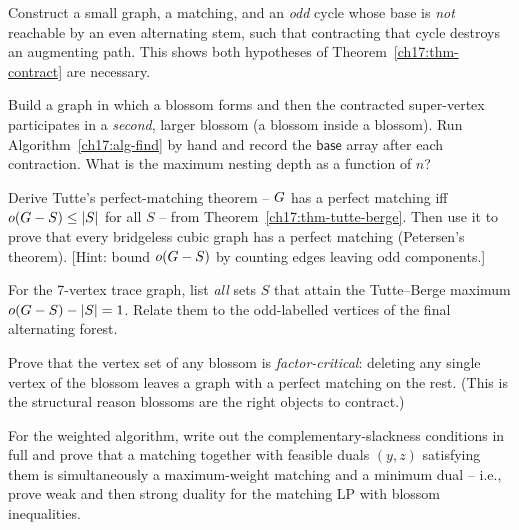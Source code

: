 \begin{exercise}
\label{ch17:ex-break}
Construct a small graph, a matching, and an \emph{odd} cycle whose base is \emph{not} reachable by an
even alternating stem, such that contracting that cycle destroys an augmenting path. This shows both
hypotheses of Theorem~\ref{ch17:thm-contract} are necessary.
\end{exercise}

\begin{exercise}
\label{ch17:ex-nested}
Build a graph in which a blossom forms and then the contracted super-vertex participates in a
\emph{second}, larger blossom (a blossom inside a blossom). Run Algorithm~\ref{ch17:alg-find} by hand
and record the $\textsf{base}$ array after each contraction. What is the maximum nesting depth as a
function of $n$?
\end{exercise}

\begin{exercise}
\label{ch17:ex-tutte}
Derive Tutte's perfect-matching theorem -- $G$ has a perfect matching iff $o(G-S)\le\lvert S\rvert$ for
all $S$ -- from Theorem~\ref{ch17:thm-tutte-berge}. Then use it to prove that every bridgeless cubic
graph has a perfect matching (Petersen's theorem). [Hint: bound $o(G-S)$ by counting edges leaving
odd components.]
\end{exercise}

\begin{exercise}
\label{ch17:ex-tutteset}
For the 7-vertex trace graph, list \emph{all} sets $S$ that attain the Tutte--Berge maximum
$o(G-S)-\lvert S\rvert=1$. Relate them to the odd-labelled vertices of the final alternating forest.
\end{exercise}

\begin{exercise}
\label{ch17:ex-factorcritical}
Prove that the vertex set of any blossom is \emph{factor-critical}: deleting any single vertex of the
blossom leaves a graph with a perfect matching on the rest. (This is the structural reason blossoms are
the right objects to contract.)
\end{exercise}

\begin{exercise}
\label{ch17:ex-slack}
For the weighted algorithm, write out the complementary-slackness conditions in full and prove that a
matching together with feasible duals $(y,z)$ satisfying them is simultaneously a maximum-weight
matching and a minimum dual -- i.e., prove weak and then strong duality for the matching LP with
blossom inequalities.
\end{exercise}

